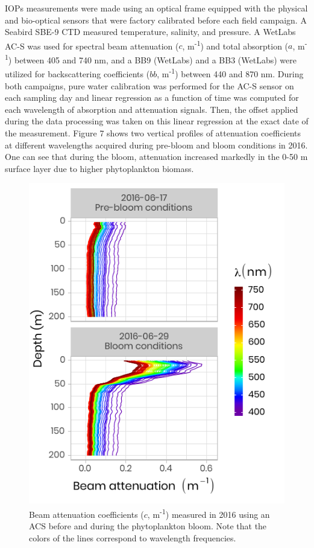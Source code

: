 \documentclass[essd, manuscript]{copernicus}
\begin{document}
IOPs measurements were made using an optical frame equipped with the physical and bio-optical sensors that were factory calibrated before each field campaign. A Seabird SBE-9 CTD measured temperature, salinity, and pressure. A WetLabs AC-S was used for spectral beam attenuation ($c$, m\textsuperscript{-1}) and total absorption ($a$, m\textsuperscript{-1}) between 405 and 740 nm, and a BB9 (WetLabs) and a BB3 (WetLabs) were utilized for backscattering coefficients ($bb$, m\textsuperscript{-1}) between 440 and 870 nm. During both campaigns, pure water calibration was performed for the AC-S sensor on each sampling day and linear regression as a function of time was computed for each wavelength of absorption and attenuation signals. Then, the offset applied during the data processing was taken on this linear regression at the exact date of the measurement. Figure 7 shows two vertical profiles of attenuation coefficients at different wavelengths acquired during pre-bloom and bloom conditions in 2016. One can see that during the bloom, attenuation increased markedly in the 0-50 m surface layer due to higher phytoplankton biomass.

\begin{figure}[H]
	\centering
	\includegraphics[scale = 1]{../../../graphs/fig07.pdf}
	\caption{Beam attenuation coefficients ($c$, m\textsuperscript{-1}) measured in 2016 using an ACS before and during the phytoplankton bloom. Note that the colors of the lines correspond to wavelength frequencies.}
\end{figure}
\end{document}
